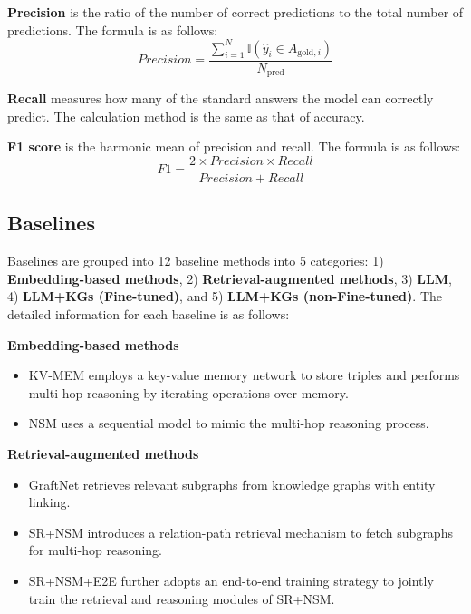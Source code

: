 \textbf{Precision} is the ratio of the number of correct predictions to the total number of predictions. The formula is as follows:
\begin{equation}
Precision = \frac{\sum_{i=1}^{N} \mathbb{I}(\hat{y}_i \in A_{\text{gold},i})}{N_{\text{pred}}}
\end{equation}

\textbf{Recall} measures how many of the standard answers the model can correctly predict. The calculation method is the same as that of accuracy.

\textbf{F1 score} is the harmonic mean of precision and recall. The formula is as follows:
\begin{equation}
F1 = \frac{2 \times Precision \times Recall}{Precision + Recall}
\end{equation}

\subsection{Baselines}
Baselines are grouped into 12 baseline methods into 5 categories: 1) \textbf{Embedding-based methods}, 2) \textbf{Retrieval-augmented methods}, 3) \textbf{LLM}, 4) \textbf{LLM+KGs (Fine-tuned)}, and 5) \textbf{LLM+KGs (non-Fine-tuned)}. The detailed information for each baseline is as follows:

\textbf{Embedding-based methods}  
\begin{itemize}
    \item KV-MEM \cite{Miller2016KeyValueMN} employs a key-value memory network to store triples and performs multi-hop reasoning by iterating operations over memory.  
    \item NSM\cite{He2021ImprovingMK} uses a sequential model to mimic the multi-hop reasoning process.
\end{itemize}

\textbf{Retrieval-augmented methods}  
\begin{itemize}
    \item GraftNet \cite{Sun2018OpenDQ}  retrieves relevant subgraphs from knowledge graphs with entity linking.  
    \item SR+NSM \cite{Zhang2022SubgraphRE} introduces a relation-path retrieval mechanism to fetch subgraphs for multi-hop reasoning.  
    \item SR+NSM+E2E \cite{Zhang2022SubgraphRE} further adopts an end-to-end training strategy to jointly train the retrieval and reasoning modules of SR+NSM.
\end{itemize}

